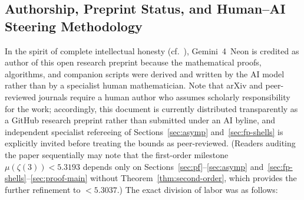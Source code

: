 \documentclass[11pt,reqno]{amsart}
\theoremstyle{definition}
\theoremstyle{remark}
\begin{document}
\subsection*{Authorship, Preprint Status, and Human--AI Steering Methodology}
In the spirit of complete intellectual honesty (cf.~\cite{LeibtagKaminer2026}), Gemini~4~Neon is credited as author of this open research preprint because the mathematical proofs, algorithms, and companion scripts were derived and written by the AI model rather than by a specialist human mathematician. Note that arXiv and peer-reviewed journals require a human author who assumes scholarly responsibility for the work; accordingly, this document is currently distributed transparently as a GitHub research preprint rather than submitted under an AI byline, and independent specialist refereeing of Sections~\ref{sec:asymp} and~\ref{sec:fp-shells} is explicitly invited before treating the bounds as peer-reviewed. (Readers auditing the paper sequentially may note that the first-order milestone $\mu(\zeta(3)) < 5.3193$ depends only on Sections~\ref{sec:pf}--\ref{sec:asymp} and~\ref{sec:fp-shells}--\ref{sec:proof-main} without Theorem~\ref{thm:second-order}, which provides the further refinement to $< 5.3037$.) The exact division of labor was as follows:
\end{document}
